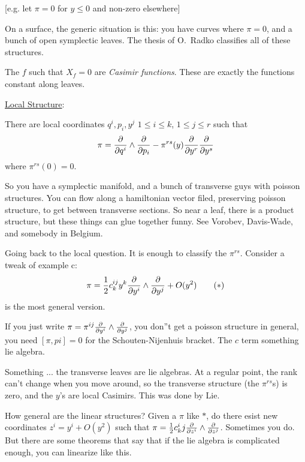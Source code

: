  [e.g. let $\pi=0$ for $y\le 0$ and non-zero elsewhere]

 On a surface, the generic situation is this: you have curves where $\pi=0$, and a
 bunch of open symplectic leaves.  The thesis of O.~Radko classifies all of these
 structures.

 The $f$ such that $X_f=0$ are \emph{Casimir functions}.  These are exactly the
 functions constant along leaves.

 \underline{Local Structure}:
 \begin{theorem}
   There are local coordinates $q^i,p_i,y^j$ $1\le i\le k$, $1\le j\le r$ such that
   \[
    \pi = \frac{\partial }{\partial q^i}\wedge \frac{\partial }{\partial p_i} - \pi^{rs}(y)\frac{\partial }{\partial y^r}\frac{\partial }{\partial y^s}
   \]
   where $\pi^{rs}(0)=0$.
 \end{theorem}
 So you have a symplectic manifold, and a bunch of transverse guys with poisson
 structures.  You can flow along a hamiltonian vector filed, preserving poisson
 structure, to get between transverse sections.  So near a leaf, there is a product
 structure, but these things can glue together funny.  See Vorobev, Davis-Wade, and
 somebody in Belgium.

 Going back to the local question.  It is enough to classify the $\pi^{rs}$.  Consider
 a tweak of example c:
 \[
 \pi = \frac{1}{2}c_k^{ij} y^k\frac{\partial }{\partial y^i}\wedge \frac{\partial }{\partial y^j} + O(y^2) \tag{$\ast$}
 \]
 is the most general version.

 If you just write $\pi=\pi^{ij}\frac{\partial }{\partial y^i}\wedge\frac{\partial }{\partial y^j}$, you don''t get a
 poisson structure in general, you need $[\pi,pi]=0$ for the Schouten-Nijenhuis
 bracket. The $c$ term something lie algebra.

 Something ... the transverse leaves are lie algebras.  At a regular point, the rank
 can't change when you move around, so the transverse structure (the $\pi^{rs}$s) is
 zero, and the $y$'s are local Casimirs. This was done by Lie.

 How general are the linear structures?  Given a $\pi$ like $\ast$, do there esist new
 coordinates $z^i=y^i+O(y^2)$ such that $\pi = \frac{1}{2}
 c_k^ij\frac{\partial }{\partial z^i}\wedge\frac{\partial }{\partial z^j}$.  Sometimes you do.  But there are some
 theorems that say that if the lie algebra is complicated enough, you can linearize
 like this.

